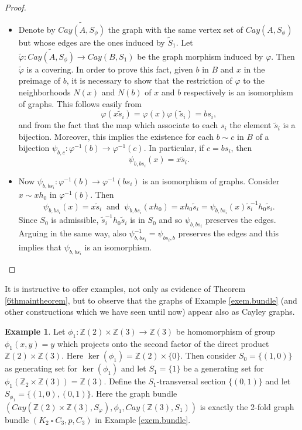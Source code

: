 \documentclass{amsart}
\theoremstyle{definition}
\newtheorem{example}[theo]{Example}
\numberwithin{equation}{section}
\begin{document}
\begin{proof}
\begin{itemize}
\item[Step 2.] Denote by $\widetilde{Cay(A, S_\phi)}$ the graph with the same vertex set of $Cay(A, S_\phi)$ but whose edges are the ones induced by $\widetilde{S}_1$. Let $\widetilde{\varphi}:\widetilde{Cay(A, S_\phi)} \longrightarrow Cay(B, S_1)$ be the graph morphism induced by $\varphi$. Then $\widetilde{\varphi}$ is a covering.
In order to prove this fact, given $b$ in $B$ and $x$ in the preimage of $b$, it is necessary to show that the restriction of $\varphi$ to the neighborhoods $N(x)$ and $N(b)$ of $x$ and $b$ respectively is an isomorphism of graphs. This follows easily from 
\begin{equation}
    \varphi(x\widetilde{s}_i) = \varphi(x)\varphi(\widetilde{s}_i) = bs_i,
\end{equation}
and from the fact that the map which associate to each $s_i$ the element $\widetilde{s}_i$ is a bijection.
Moreover, this implies the existence for each $b \sim c$ in $B$ of a bijection $\psi_{b,c}: \varphi^{-1}(b) \longrightarrow \varphi^{-1}(c)$. In particular, if $c = bs_i$, then
\begin{equation}
\psi_{b,bs_i}(x) = x\widetilde{s}_i. 
\end{equation}
\item[Step 3.] Now $\psi_{b,bs_i}: \varphi^{-1}(b) \longrightarrow \varphi^{-1}(bs_i)$ is an isomorphism of graphs. Consider $x \sim xh_0$ in $\varphi^{-1}(b)$. Then 
\begin{equation}
    \psi_{b,bs_i}(x) = x\widetilde{s}_i  \ \mbox{  and  }  \ \psi_{b,bs_i}(xh_0) = xh_0\widetilde{s}_i = \psi_{b,bs_i}(x)\widetilde{s}_i^{-1}h_0\widetilde{s}_i.
\end{equation}
Since $S_0$ is admissible,  $\widetilde{s}_i^{-1}h_0\widetilde{s}_i$ is in $S_0$ and so $\psi_{b,bs_i}$ preserves the edges. Arguing in the  same way, also $\psi_{b,bs_i}^{-1} = \psi_{bs_i,b}$ preserves the edges and this implies that $\psi_{b,bs_i}$ is an isomorphism.
\end{itemize}
\end{proof}

It is instructive to offer examples, not only as evidence of Theorem \ref{6thmaintheorem}, but to observe that the graphs of Example \ref{exem.bundle} (and other constructions which we have seen until now) appear also as  Cayley graphs.


\begin{example}\label{exem.uno}
Let $\phi_1: \mathbb{Z}(2) \times \mathbb{Z}(3) \longrightarrow \mathbb{Z}(3)$ be homomorphism of group  $\phi_1(x,y)= y$ which projects onto the second factor of the direct product $\mathbb{Z}(2) \times \mathbb{Z}(3)$. Here $\ker(\phi_1) = \mathbb{Z}(2) \times \{0\}$. Then consider $S_{0} = \{(1,0)\}$ as generating set for $\ker(\phi_1)$ and let $S_1 = \{1\}$ be a generating set for $\phi_1(\mathbb{Z}_2 \times \mathbb{Z}(3)) = \mathbb{Z}(3)$. Define the $S_1$-transversal section $\{(0,1)\}$ and let $S_{\phi_1} = \{(1,0), (0,1)\}$. Here the graph bundle $(Cay(\mathbb{Z}(2) \times \mathbb{Z}(3), S_{\varphi}), \phi_1, Cay(\mathbb{Z}(3), S_1))$ is exactly the 2-fold graph bundle $(K_2  \ \square \  C_3, p, C_3)$ in Example \ref{exem.bundle}.
\end{example}
\end{document}
